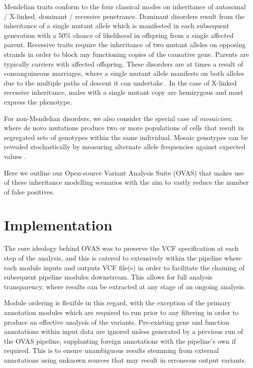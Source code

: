 \documentclass[twocolumn]{bmcart}%
\def\app{OVAS}
\begin{document}
Mendelian traits conform to the four classical modes on inheritance of autosomal / X-linked, dominant / recessive penetrance. Dominant disorders result from the inheritance of a single mutant allele which is manifested in each subsequent generation with a 50\% chance of likelihood in offspring from a single affected parent. Recessive traits require the inheritance of two mutant alleles on opposing strands in order to block any functioning copies of the causative gene. Parents are typically carriers with affected offspring. These disorders are at times a result of consanguineous marriages, where a single mutant allele manifests on both alleles due to the multiple paths of descent it can undertake \cite{kari2014consanguinity}. In the case of X-linked recessive inheritance, males with a single mutant copy are hemizygous and must express the phenotype. %

For non-Mendelian disorders, we also consider the special case of \textit{mosaicism}; where de novo mutations produce two or more populations of cells that result in segregated sets of genotypes within the same individual. Mosaic genotypes can be revealed stochastically by measuring alternate allele frequencies against expected values \cite{biesecker2013genomic}.

Here we outline our Open-source Variant Analysis Suite (\app{}) that makes use of these inheritance modelling scenarios with the aim to vastly reduce the number of false positives.

\section*{Implementation}
The core ideology behind \app{} was to preserve the VCF specification at each step of the analysis, and this is catered to extensively within the pipeline where each module inputs and outputs VCF file(s) in order to facilitate the chaining of subsequent pipeline modules downstream. This allows for full analysis transparency, where results can be extracted at any stage of an ongoing analysis.

Module ordering is flexible in this regard, with the exception of the primary annotation modules which are required to run prior to any filtering in order to produce an effective analysis of the variants. Pre-existing gene and function annotations within input data are ignored unless generated by a previous run of the \app{} pipeline, supplanting foreign annotations with the pipeline's own if required. This is to ensure unambiguous results stemming from external annotations using unknown sources that may result in erroneous output variants.
\end{document}
